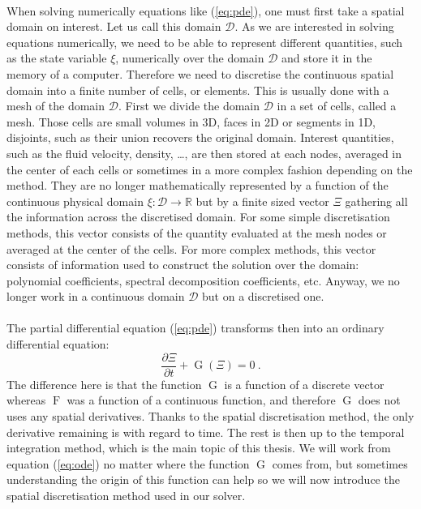     \paragraph{}
    When solving numerically equations like (\ref{eq:pde}), one must first take a spatial domain on interest.
    Let us call this domain $\mathcal{D}$.
    As we are interested in solving equations numerically, we need to be able to represent different quantities, such as the state variable $\xi$, numerically over the domain $\mathcal{D}$ and store it in the memory of a computer.
    Therefore we need to discretise the continuous spatial domain into a finite number of cells, or elements.
    This is usually done with a mesh of the domain $\mathcal{D}$.
    First we divide the domain $\mathcal{D}$ in a set of cells, called a mesh.
    Those cells are small volumes in 3D, faces in 2D or segments in 1D, disjoints, such as their union recovers the original domain.
    Interest quantities, such as the fluid velocity, density, \dots, are then stored at each nodes, averaged in the center of each cells or sometimes in a more complex fashion depending on the method.
    They are no longer mathematically represented by a function of the continuous physical domain $\xi : \mathcal{D} \rightarrow \mathbb{R}$ but by a finite sized vector $\Xi$ gathering all the information across the discretised domain.
    For some simple discretisation methods, this vector consists of the quantity evaluated at the mesh nodes or averaged at the center of the cells.
    For more complex methods, this vector consists of information used to construct the solution over the domain: polynomial coefficients, spectral decomposition coefficients, etc.
    Anyway, we no longer work in a continuous domain $\mathcal{D}$ but on a discretised one.

    \paragraph{}
    The partial differential equation (\ref{eq:pde}) transforms then into an ordinary differential equation:
    \begin{equation}\label{eq:ode}
      \frac{\partial \Xi}{\partial t} + \operatorname{G}\left(\Xi\right) = 0 \ .
    \end{equation}
    The difference here is that the function $\operatorname{G}$ is a function of a discrete vector whereas $\operatorname{F}$ was a function of a continuous function, and therefore $\operatorname{G}$ does not uses any spatial derivatives.
    Thanks to the spatial discretisation method, the only derivative remaining is with regard to time.
    The rest is then up to the temporal integration method, which is the main topic of this thesis.
    We will work from equation (\ref{eq:ode}) no matter where the function $\operatorname{G}$ comes from, but sometimes understanding the origin of this function can help so we will now introduce the spatial discretisation method used in our solver.


